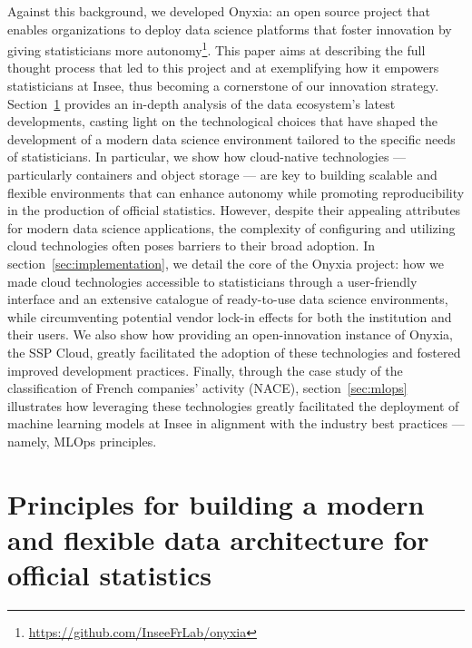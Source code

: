 \documentclass[graybox]{svmult}
\begin{document}
Against this background, we developed Onyxia: an open source project that enables organizations to deploy data science platforms that foster innovation by giving statisticians more autonomy\footnote{\url{https://github.com/InseeFrLab/onyxia}}. This paper aims at describing the full thought process that led to this project and at exemplifying how it empowers statisticians at Insee, thus becoming a cornerstone of our innovation strategy. Section~\ref{sec:principles} provides an in-depth analysis of the data ecosystem's latest developments, casting light on the technological choices that have shaped the development of a modern data science environment tailored to the specific needs of statisticians. In particular, we show how cloud-native technologies — particularly containers and object storage — are key to building scalable and flexible environments that can enhance autonomy while promoting reproducibility in the production of official statistics. However, despite their appealing attributes for modern data science applications, the complexity of configuring and utilizing cloud technologies often poses barriers to their broad adoption. In section~\ref{sec:implementation}, we detail the core of the Onyxia project: how we made cloud technologies accessible to statisticians through a user-friendly interface and an extensive catalogue of ready-to-use data science environments, while circumventing potential vendor lock-in effects for both the institution and their users. We also show how providing an open-innovation instance of Onyxia, the SSP Cloud, greatly facilitated the adoption of these technologies and fostered improved development practices. Finally, through the case study of the classification of French companies' activity (NACE), section~\ref{sec:mlops} illustrates how leveraging these technologies greatly facilitated the deployment of machine learning models at Insee in alignment with the industry best practices — namely, MLOps principles.




\section{Principles for building a modern and flexible data architecture for official statistics}
\label{sec:principles}
\end{document}
